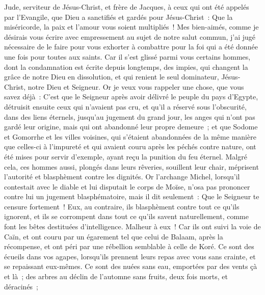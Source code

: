 \begin{multicols}{2}
\VerseOne{}Jude, serviteur de Jésus-Christ, et frère de Jacques, à ceux qui ont été appelés par l'Evangile, que Dieu a sanctifiés et gardés pour Jésus-Christ~:
Que la miséricorde, la paix et l'amour vous soient multipliés~!
Mes bien-aimés, comme je désirais vous écrire avec empressement au sujet de notre salut commun, j'ai jugé nécessaire de le faire pour vous exhorter à combattre pour la foi qui a été donnée une fois pour toutes aux saints.
Car il s'est glissé parmi vous certains hommes, dont la condamnation est écrite depuis longtemps, des impies, qui changent la grâce de notre Dieu en dissolution, et qui renient le seul dominateur, Jésus-Christ, notre Dieu et Seigneur.
Or je veux vous rappeler une chose, que vous savez déjà~: C'est que le Seigneur après avoir délivré le peuple du pays d'Egypte, détruisit ensuite ceux qui n'avaient pas cru,
et qu'il a réservé sous l'obscurité, dans des liens éternels, jusqu'au jugement du grand jour, les anges qui n'ont pas gardé leur origine, mais qui ont abandonné leur propre demeure~;
et que Sodome et Gomorrhe et les villes voisines, qui s'étaient abandonnées de la même manière que celles-ci à l'impureté et qui avaient couru après les péchés contre nature, ont été mises pour servir d'exemple, ayant reçu la punition du feu éternel. 
Malgré cela, ces hommes aussi, plongés dans leurs rêveries, souillent leur chair, méprisent l'autorité et blasphèment contre les dignités.
Or l'archange Michel, lorsqu'il contestait avec le diable et lui disputait le corps de Moïse, n'osa pas prononcer contre lui un jugement blasphématoire, mais il dit seulement~: Que le Seigneur te censure fortement~!
Eux, au contraire, ils blasphèment contre tout ce qu'ils ignorent, et ils se corrompent dans tout ce qu'ils savent naturellement, comme font les bêtes destituées d'intelligence.
Malheur à eux~! Car ils ont suivi la voie de Caïn, et ont couru par un égarement tel que celui de Balaam, après la récompense, et ont péri par une rébellion semblable à celle de Koré.
Ce sont des écueils dans vos agapes, lorsqu'ils prennent leurs repas avec vous sans crainte, et se repaissant eux-mêmes. Ce sont des nuées sans eau, emportées par des vents çà et là~; des arbres au déclin de l'automne sans fruits, deux fois morts, et déracinés~;

\end{multicols}
